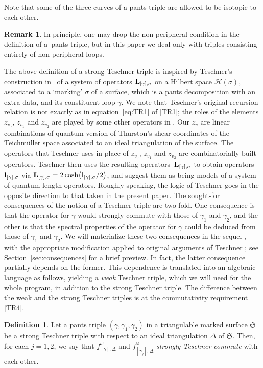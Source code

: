 \documentclass[pdftex]{sigma}
\numberwithin{equation}{section}
\theoremstyle{definition}
\newtheorem{Definition}[Theorem]{Definition}
\newtheorem{Remark}[Theorem]{Remark}
\begin{document}
Note that some of the three curves of a pants triple are allowed to be isotopic to each other.
\begin{Remark}
In principle, one may drop the non-peripheral condition in the definition of a~pants triple, but in this paper we deal only with triples consisting entirely of non-peripheral loops.
\end{Remark}
The above definition of a strong Teschner triple is inspired by Teschner's construction in~\cite{T} of a system of operators ${\bf L}_{[\gamma], \sigma}$ on a Hilbert space $\mathcal{H}(\sigma)$, associated to a `marking' $\sigma$ of a surface, which is a pants decomposition with an extra data, and its constituent loop $\gamma$. We note that Teschner's original recursion relation is not exactly as in equation~\eqref{eq:TR1} of \ref{TR1}; the roles of the elements $z_{v_\gamma}$, $z_{v_1}$ and $z_{v_2}$ are played by some other operators in \cite{T}. Our $z_v$ are linear combinations of quantum version of Thurston's shear coordinates of the Teichm\"uller space associated to an ideal triangulation of the surface. The operators that Teschner uses in place of $z_{v_\gamma}$, $z_{v_1}$ and $z_{v_2}$ are combinatorially built operators. Teschner then uses the resulting operators~${\bf L}_{[\gamma],\sigma}$ to obtain operators~${\bf l}_{[\gamma],\sigma}$ via ${\bf L}_{[\gamma],\sigma} = 2\cosh\bigl({\bf l}_{[\gamma],\sigma}/2\bigr)$, and suggest them as being models of a system of quantum length operators. Roughly speaking, the logic of Teschner goes in the opposite direction to that taken in the present paper.
The sought-for consequences of the notion of a Teschner triple are two-fold. One consequence is that the operator for $\gamma$ would strongly commute with those of $\gamma_1$ and $\gamma_2$, and the other is that the spectral properties of the operator for $\gamma$ could be deduced from those of $\gamma_1$ and $\gamma_2$. We will materialize these two consequences in the sequel \cite{sequel}, with the appropriate modification applied to original arguments of Teschner \cite{T}; see Section~\ref{sec:consequences} for a brief preview. In fact, the latter consequence partially depends on the former. This dependence is translated into an algebraic language as follows, yielding a {\it weak} Teschner triple, which we will need for the whole program, in addition to the strong Teschner triple. The difference between the weak and the strong Teschner triples is at the commutativity requirement \ref{TR4}.
\begin{Definition}
\label{def:Teschner-commute}
Let a pants triple $(\gamma,\gamma_1,\gamma_2)$ in a triangulable marked surface $\mathfrak{S}$ be a strong Teschner triple with respect to an ideal triangulation $\Delta$ of $\mathfrak{S}$. Then, for each $j=1,2$, we say that $f^\omega_{[\gamma],\Delta}$ and $f^\omega_{[\gamma_j],\Delta}$ {\em strongly Teschner-commute} with each other.
\end{Definition}
\end{document}
